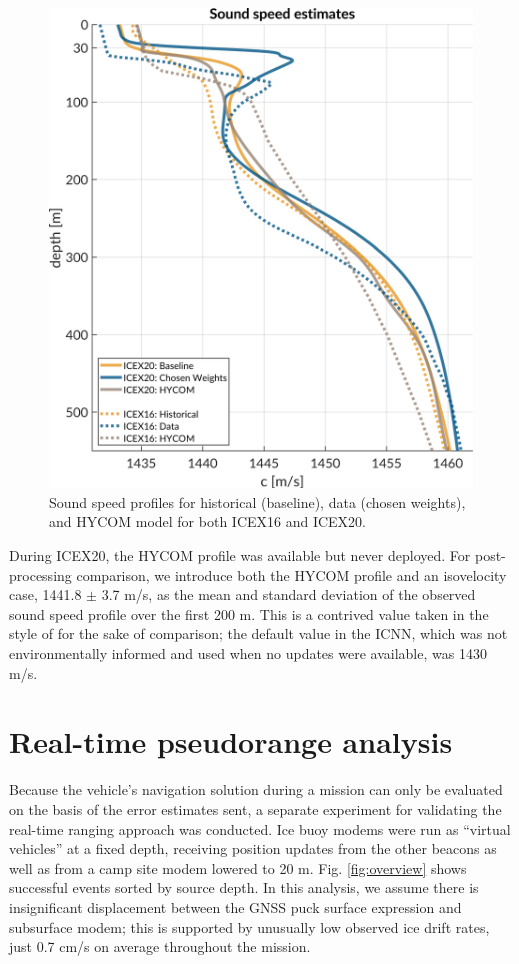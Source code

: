 \documentclass[preprint,TurnOnLineNumbers]{JASA}
\newcommand{\llabel}[1]{\hypertarget{llineno:#1}{\linelabel{#1}}}
\begin{document}
\begin{figure}[!ht]
    \centering
    \includegraphics[width=\reprintcolumnwidth]{Fig3.pdf}
    \caption{Sound speed profiles for historical (baseline), data (chosen weights), and HYCOM model for both ICEX16 and ICEX20.}
    \label{fig:sspExpectation}
\end{figure}

During ICEX20, the HYCOM profile was available but never deployed. \llabel{1.14}
For post-processing comparison, we introduce both the HYCOM profile and an isovelocity case, 1441.8 $\pm$ 3.7 m/s, as the mean and standard deviation of the observed sound speed profile over the first 200 m.
This is a contrived value taken in the style of \citet{Graupe2019} for the sake of comparison; the default value in the ICNN, which was not environmentally informed and used when no updates were available, was 1430 m/s.

\clearpage
\section{\label{sec:realtime} Real-time pseudorange analysis}

Because the vehicle's navigation solution during a mission can only be evaluated on the basis of the error estimates sent, a separate experiment for validating the real-time ranging approach was conducted.
Ice buoy modems were run as ``virtual vehicles'' at a fixed depth, receiving position updates from the other beacons as well as from a camp site modem lowered to 20 m. %
Fig. \ref{fig:overview} shows successful events sorted by source depth.
\llabel{1.10}
In this analysis, we assume there is insignificant displacement between the GNSS puck surface expression and subsurface modem; this is supported by unusually low observed ice drift rates, just 0.7 cm/s on average throughout the mission.
\end{document}
